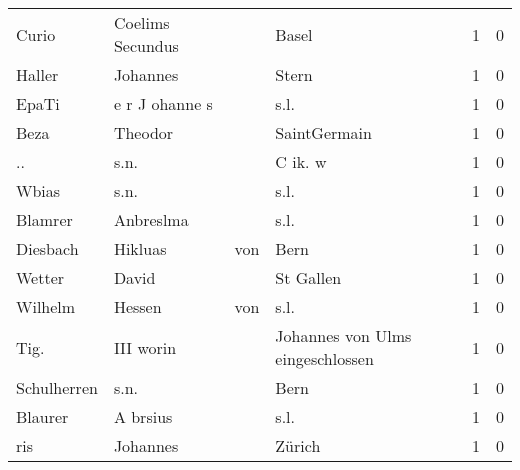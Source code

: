 \begin{tabular}{llllrr}
                    Curio &                   Coelims Secundus &             &                                       Basel &          1 &         0 \\
                   Haller &                           Johannes &             &                                       Stern &          1 &         0 \\
                    EpaTi &                     e r J ohanne s &             &                                        s.l. &          1 &         0 \\
                     Beza &                            Theodor &             &                                SaintGermain &          1 &         0 \\
                       .. &                               s.n. &             &                                     C ik. w &          1 &         0 \\
                    Wbias &                               s.n. &             &                                        s.l. &          1 &         0 \\
                  Blamrer &                          Anbreslma &             &                                        s.l. &          1 &         0 \\
                 Diesbach &                            Hikluas &         von &                                        Bern &          1 &         0 \\
                   Wetter &                              David &             &                                   St Gallen &          1 &         0 \\
                  Wilhelm &                             Hessen &         von &                                        s.l. &          1 &         0 \\
                     Tig. &                          III worin &             &            Johannes von Ulms eingeschlossen &          1 &         0 \\
              Schulherren &                               s.n. &             &                                        Bern &          1 &         0 \\
                  Blaurer &                           A brsius &             &                                        s.l. &          1 &         0 \\
                      ris &                           Johannes &             &                                      Zürich &          1 &         0 \\

\end{tabular}
